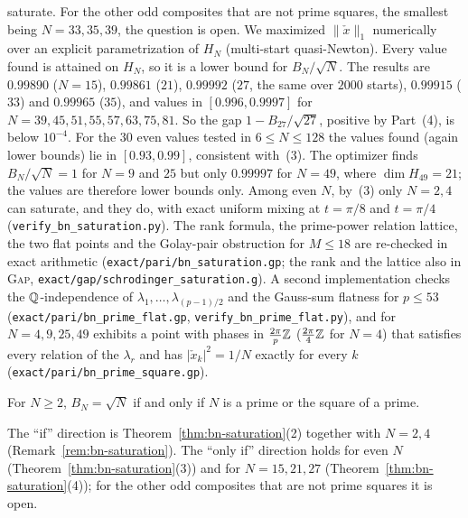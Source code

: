 \begin{remark}
saturate. For the other odd composites that are not prime squares, the smallest being $N=33,35,39$, the question
is open. We maximized $\|\check x\|_1$ numerically over an explicit parametrization of $H_N$
(multi-start quasi-Newton). Every value found is attained on $H_N$, so it is a lower bound for $B_N/\sqrt N$.
The results are $0.99890$ ($N=15$), $0.99861$ ($21$), $0.99992$ ($27$, the same over $2000$ starts),
$0.99915$ ($33$) and $0.99965$ ($35$), and values in $[0.996,0.9997]$ for $N=39,45,51,55,57,63,75,81$.
So the gap $1-B_{27}/\sqrt{27}$, positive by Part~(4), is below $10^{-4}$.
For the $30$ even values tested in $6\le N\le128$ the values found (again lower bounds) lie in $[0.93,0.99]$,
consistent with~(3).
The optimizer finds $B_N/\sqrt N=1$ for $N=9$ and $25$ but only $0.99997$ for $N=49$, where
$\dim H_{49}=21$; the values are therefore lower bounds only. Among even $N$, by~(3) only $N=2,4$ can saturate, and they
do, with exact uniform mixing at $t=\pi/8$ and $t=\pi/4$ (\texttt{verify\_bn\_saturation.py}). The rank formula,
the prime-power relation lattice, the two flat points and the Golay-pair obstruction for $M\le18$ are
re-checked in exact arithmetic (\texttt{exact/pari/bn\_saturation.gp}; the rank and the lattice also in
\textsc{Gap}, \texttt{exact/gap/schrodinger\_saturation.g}). A second implementation checks the
$\mathbb{Q}$-independence of $\lambda_1,\dots,\lambda_{(p-1)/2}$ and the Gauss-sum flatness for $p\le53$
(\texttt{exact/pari/bn\_prime\_flat.gp}, \texttt{verify\_bn\_prime\_flat.py}), and for $N=4,9,25,49$ exhibits a
point with phases in $\tfrac{2\pi}p\mathbb{Z}$ ($\tfrac{2\pi}4\mathbb{Z}$ for $N=4$) that satisfies every relation of the
$\lambda_r$ and has $|\check x_k|^2=1/N$ exactly for every $k$ (\texttt{exact/pari/bn\_prime\_square.gp}).
\end{remark}

\begin{conjecture}\label{conj:bn-psq}
For $N\ge2$, $B_N=\sqrt N$ if and only if $N$ is a prime or the square of a prime.
\end{conjecture}

\noindent The ``if'' direction is Theorem~\ref{thm:bn-saturation}(2) together with $N=2,4$
(Remark~\ref{rem:bn-saturation}). The ``only if'' direction holds for even $N$
(Theorem~\ref{thm:bn-saturation}(3)) and for $N=15,21,27$ (Theorem~\ref{thm:bn-saturation}(4)); for the other odd
composites that are not prime squares it is open.

